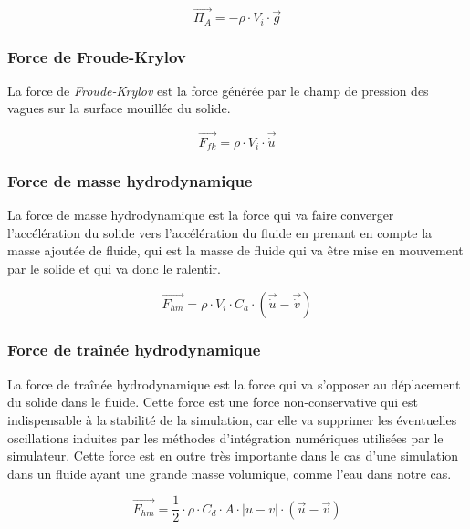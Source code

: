 				\begin{equation}
					\overrightarrow{\Pi_A} = - \rho \cdot V_i \cdot \overrightarrow{g}
				\end{equation}

			\subsubsection{Force de Froude-Krylov}

				La force de \textit{Froude-Krylov} est la force générée par le champ de pression des vagues sur la surface mouillée du solide.

				\begin{equation}
					\overrightarrow{F_{fk}} = \rho \cdot V_i \cdot \overrightarrow{\dot{u}}
				\end{equation}

			\subsubsection{Force de masse hydrodynamique}

				La force de masse hydrodynamique est la force qui va faire converger l'accélération du solide vers l'accélération du fluide en prenant en compte la masse ajoutée de fluide, qui est la masse de fluide qui va être mise en mouvement par le solide et qui va donc le ralentir.

				\begin{equation}
					\overrightarrow{F_{hm}} = \rho \cdot V_i \cdot C_a \cdot (\overrightarrow{\dot{u}} - \overrightarrow{\dot{v}})
				\end{equation}

			\subsubsection{Force de traînée hydrodynamique}

				La force de traînée hydrodynamique est la force qui va s'opposer au déplacement du solide dans le fluide. Cette force est une force non-conservative qui est indispensable à la stabilité de la simulation, car elle va supprimer les éventuelles oscillations induites par les méthodes d'intégration numériques utilisées par le simulateur. Cette force est en outre très importante dans le cas d'une simulation dans un fluide ayant une grande masse volumique, comme l'eau dans notre cas.

				\begin{equation}
					\overrightarrow{F_{hm}} = \frac{1}{2} \cdot \rho \cdot C_d \cdot A \cdot |u - v| \cdot (\overrightarrow{u} - \overrightarrow{v})
				\end{equation}

